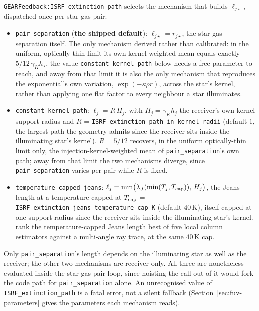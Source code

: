 \texttt{GEARFeedback:ISRF\_extinction\_path} selects the mechanism that
builds $\ell_{j\star}$, dispatched once per star-gas pair:
\begin{itemize}
  \item \texttt{pair\_separation} (\textbf{the shipped default}):
    $\ell_{j\star} = r_{j\star}$, the star-gas separation itself. The only
    mechanism derived rather than calibrated: in the uniform,
    optically-thin limit its own kernel-weighted mean equals exactly
    $5/12\,\gamma_K h_\star$, the value \texttt{constant\_kernel\_path}
    below needs a free parameter to reach, and away from that limit it is
    also the only mechanism that reproduces the exponential's own
    variation, $\exp(-\kappa\rho r)$, across the star's kernel, rather
    than applying one flat factor to every neighbour a star illuminates.
  \item \texttt{constant\_kernel\_path}: $\ell_j = R\,H_j$, with $H_j =
    \gamma_K h_j$ the receiver's own kernel support radius and $R$ =
    \texttt{ISRF\_extinction\_path\_in\_kernel\_radii} (default $1$, the
    largest path the geometry admits since the receiver sits inside the
    illuminating star's kernel). $R=5/12$ recovers, in the uniform
    optically-thin limit only, the injection-kernel-weighted mean of
    \texttt{pair\_separation}'s own path; away from that limit the two
    mechanisms diverge, since \texttt{pair\_separation} varies per pair
    while $R$ is fixed.
  \item \texttt{temperature\_capped\_jeans}: $\ell_j = \min\!\big(
    \lambda_J(\min(T_j, T_{\rm cap})),\, H_j\big)$, the Jeans length at a
    temperature capped at $T_{\rm cap}$ =
    \texttt{ISRF\_extinction\_jeans\_temperature\_cap\_K} (default
    $40$\,K), itself capped at one support radius since the receiver sits
    inside the illuminating star's kernel. \citet[their
    Section~3.4]{SafranekShrader2017} rank the temperature-capped Jeans
    length best of five local column estimators against a multi-angle ray
    trace, at the same $40$\,K cap.
\end{itemize}
Only \texttt{pair\_separation}'s length depends on the illuminating star
as well as the receiver; the other two mechanisms are receiver-only. All
three are nonetheless evaluated inside the star-gas pair loop, since
hoisting the call out of it would fork the code path for
\texttt{pair\_separation} alone. An unrecognised
value of \texttt{ISRF\_extinction\_path} is a fatal error, not a silent
fallback (Section~\ref{sec:fuv-parameters} gives the parameters each
mechanism reads).

